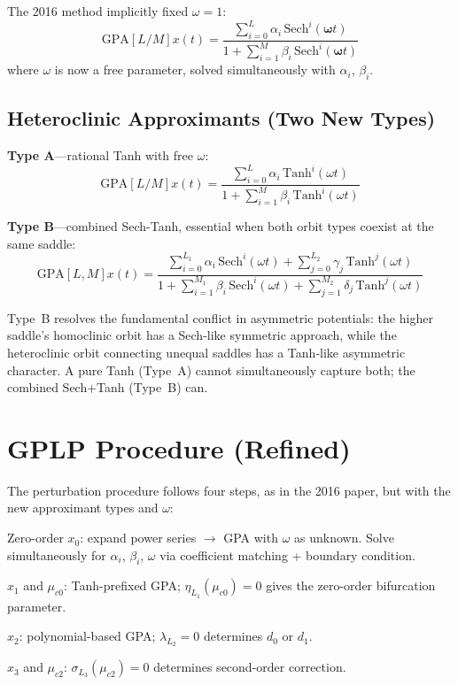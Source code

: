 \documentclass[11pt,a4paper]{article}
\begin{document}
The 2016 method implicitly fixed $\omega=1$:
\begin{equation}
\text{GPA}[L/M]x(t) = \frac{\sum_{i=0}^{L}\alpha_i\,\text{Sech}^i(\boldsymbol{\omega} t)}{1+\sum_{i=1}^{M}\beta_i\,\text{Sech}^i(\boldsymbol{\omega} t)}
\label{eq:homoclinic_improved}
\end{equation}
where $\omega$ is now a free parameter, solved simultaneously with $\alpha_i$, $\beta_i$.

\subsection{Heteroclinic Approximants (Two New Types)}

\textbf{Type A}---rational Tanh with free $\omega$:
\begin{equation}
\text{GPA}[L/M]x(t) = \frac{\sum_{i=0}^{L}\alpha_i\,\text{Tanh}^i(\omega t)}{1+\sum_{i=1}^{M}\beta_i\,\text{Tanh}^i(\omega t)}
\label{eq:hetero_a}
\end{equation}

\textbf{Type B}---combined Sech-Tanh, essential when both orbit types coexist at the same saddle:
\begin{equation}
\text{GPA}[L,M]x(t) = \frac{\sum_{i=0}^{L_1}\alpha_i\,\text{Sech}^i(\omega t) + \sum_{j=0}^{L_2}\gamma_j\,\text{Tanh}^j(\omega t)}{1+\sum_{i=1}^{M_1}\beta_i\,\text{Sech}^i(\omega t) + \sum_{j=1}^{M_2}\delta_j\,\text{Tanh}^j(\omega t)}
\label{eq:hetero_b}
\end{equation}

Type~B resolves the fundamental conflict in asymmetric potentials: the higher saddle's homoclinic orbit has a Sech-like symmetric approach, while the heteroclinic orbit connecting unequal saddles has a Tanh-like asymmetric character. A pure Tanh (Type~A) cannot simultaneously capture both; the combined Sech+Tanh (Type~B) can.

\section{GPLP Procedure (Refined)}

The perturbation procedure follows four steps, as in the 2016 paper, but with the new approximant types and $\omega$:

\begin{description}[leftmargin=2em]
\item[Step I] Zero-order $x_0$: expand power series $\to$ GPA with $\omega$ as unknown. Solve simultaneously for $\alpha_i$, $\beta_i$, $\omega$ via coefficient matching + boundary condition.
\item[Step II] $x_1$ and $\mu_{c0}$: Tanh-prefixed GPA; $\eta_{L_1}(\mu_{c0})=0$ gives the zero-order bifurcation parameter.
\item[Step III] $x_2$: polynomial-based GPA; $\lambda_{L_2}=0$ determines $d_0$ or $d_1$.
\item[Step IV] $x_3$ and $\mu_{c2}$: $\sigma_{L_3}(\mu_{c2})=0$ determines second-order correction.
\end{description}
\end{document}
